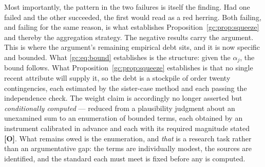 \begin{remark}
Most importantly, the pattern in the two failures is itself the
finding. Had one failed and the other succeeded, the first would read as
a red herring. Both failing, and failing for the same reason, is what
establishes Proposition~\ref{gc:prop:squeeze} and thereby the
aggregation strategy. The negative results carry the argument. This is where the argument's remaining empirical debt sits, and it is
now specific and bounded. What \eqref{gc:eq:bound} establishes is the
structure: given the $\alpha_j$, the bound follows. What
Proposition~\ref{gc:prop:squeeze} establishes is that no single recent
attribute will supply it, so the debt is a stockpile of order twenty
contingencies, each estimated by the sister-case method and each passing
the independence check. The weight claim is accordingly no longer
asserted but \emph{conditionally computed} --- reduced from a
plausibility judgment about an unexamined sum to an enumeration of
bounded terms, each obtained by an instrument calibrated in advance and
each with its required magnitude stated \textbf{[O]}. What remains owed
is the enumeration, and \emph{that} is a research task rather than an
argumentative gap: the terms are individually modest, the sources are
identified, and the standard each must meet is fixed before any is
computed.
\end{remark}

